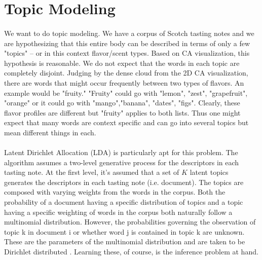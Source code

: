 \documentclass{article}
\begin{document}
\section{Topic Modeling}
\paragraph{}We want to do topic modeling. We have a corpus of Scotch tasting notes and we are hypothesizing that this entire body can be described in terms of only a few "topics" -- or in this context flavor/scent types. Based on CA visualization, this hypothesis is reasonable. We do not expect that the words in each topic are completely disjoint. Judging by the dense cloud from the 2D CA visualization, there are words that might occur frequently between two types of flavors. An example would be "fruity." "Fruity" could go with "lemon", "zest", "grapefruit", "orange" or it could go with "mango","banana", "dates", "figs". Clearly, these flavor profiles are different but "fruity" applies to both lists. Thus one might expect that many words are context specific and can go into several topics but mean different things in each.
\paragraph{} Latent Dirichlet Allocation (LDA) is particularly apt for this problem. The algorithm assumes a two-level generative process for the descriptors in each tasting note. At the first level, it's assumed that a set of $K$ latent topics generates the descriptors in each tasting note (i.e. document). The topics are composed with varying weights from the words in the corpus. Both the probability of a document having a specific distribution of topics and a topic having a specific weighting of words in the corpus both naturally follow a multinomial distribution. However, the probabilities governing the observation of topic k in document i or whether word j is contained in topic k are unknown. These are the parameters of the multinomial distribution and are taken to be Dirichlet distributed . Learning these, of course, is the inference problem at hand. 
\end{document}
